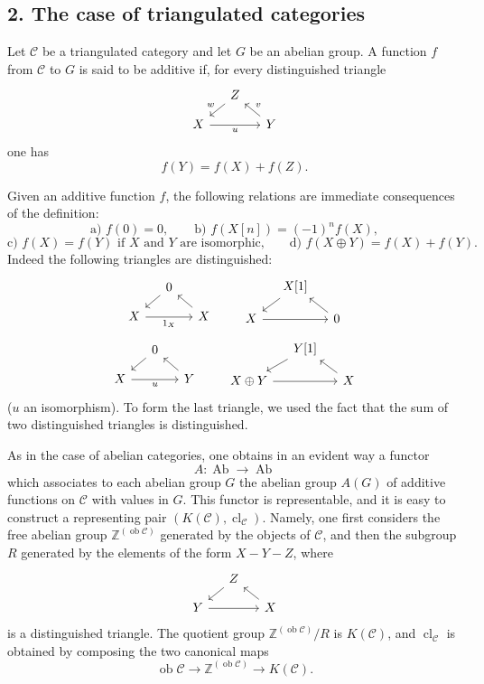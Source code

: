 \documentclass[11pt]{article}
\providecommand{\Ob}{\operatorname{ob}}
\providecommand{\cC}{\mathcal C}
\providecommand{\Ob}{\operatorname{ob}}
\providecommand{\Ab}{\operatorname{Ab}}
\providecommand{\cC}{\mathcal C}
\providecommand{\Ab}{\operatorname{Ab}}
\providecommand{\Ob}{\operatorname{Ob}}
\providecommand{\Ob}{\operatorname{ob}}
\providecommand{\Ob}{\operatorname{Ob}}
\begin{document}
\subsection*{2. The case of triangulated categories}\label{sga5:VIII:subsection:2}

Let $\cC$ be a triangulated category and let $G$ be an abelian group. A function $f$ from $\cC$ to $G$ is said to be additive if, for every distinguished triangle
\[
\begin{tikzcd}[column sep=small,row sep=small]
& Z \arrow[dl,"w"']\\
X \arrow[rr,"u"'] && Y \arrow[ul,"v"']
\end{tikzcd}
\]
one has
\[
f(Y)=f(X)+f(Z).
\]

Given an additive function $f$, the following relations are immediate consequences of the definition:
\[
\text{a) } f(0)=0,\qquad
\text{b) } f(X[n])=(-1)^n f(X),
\]
\[
\text{c) } f(X)=f(Y)\text{ if }X\text{ and }Y\text{ are isomorphic,}
\qquad
\text{d) } f(X\oplus Y)=f(X)+f(Y).
\]
Indeed the following triangles are distinguished:
\[
\begin{tikzcd}[column sep=small,row sep=small]
&0 \arrow[dl]\\ X \arrow[rr,"1_X"']&&X\arrow[ul]
\end{tikzcd}
\qquad
\begin{tikzcd}[column sep=small,row sep=small]
&X[1]\arrow[dl]\\ X\arrow[rr]&&0\arrow[ul]
\end{tikzcd}
\]
\[
\begin{tikzcd}[column sep=small,row sep=small]
&0\arrow[dl]\\ X\arrow[rr,"u"']&&Y\arrow[ul]
\end{tikzcd}
\qquad
\begin{tikzcd}[column sep=small,row sep=small]
&Y[1]\arrow[dl]\\ X\oplus Y\arrow[rr]&&X\arrow[ul]
\end{tikzcd}
\]
($u$ an isomorphism). To form the last triangle, we used the fact that the sum of two distinguished triangles is distinguished.

As in the case of abelian categories, one obtains in an evident way a functor
\[
A:\Ab\longrightarrow\Ab
\]
which associates to each abelian group $G$ the abelian group $A(G)$ of additive functions on $\cC$ with values in $G$. This functor is representable, and it is easy to construct a representing pair $(K(\cC),\operatorname{cl}_{\cC})$. Namely, one first considers the free abelian group $\mathbb Z^{(\Ob\cC)}$ generated by the objects of $\cC$, and then the subgroup $R$ generated by the elements of the form $X-Y-Z$, where
\[
\begin{tikzcd}[column sep=small,row sep=small]
&Z\arrow[dl]\\ Y\arrow[rr]&&X\arrow[ul]
\end{tikzcd}
\]
is a distinguished triangle. The quotient group $\mathbb Z^{(\Ob\cC)}/R$ is $K(\cC)$, and $\operatorname{cl}_{\cC}$ is obtained by composing the two canonical maps
\[
\Ob\cC\longrightarrow \mathbb Z^{(\Ob\cC)}\longrightarrow K(\cC).
\]
\end{document}
